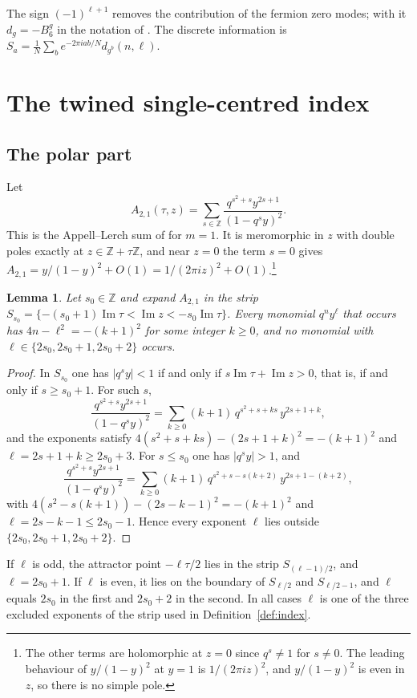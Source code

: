 \documentclass[11pt]{amsart}
\newtheorem{lemma}[theorem]{Lemma}
\theoremstyle{definition}
\newcommand{\ZZ}{\mathbb{Z}}
\begin{document}
The sign $(-1)^{\ell+1}$ removes the contribution of the fermion zero modes; with it $d_g=-B_6^{g}$ in the notation of \cite{GSSV23}. The discrete information is $S_a=\frac1N\sum_be^{-2\pi iab/N}d_{g^b}(n,\ell)$.

\section{The twined single-centred index}\label{sec:finite}

\subsection{The polar part}
Let
\[
A_{2,1}(\tau,z)=\sum_{s\in\ZZ}\frac{q^{s^2+s}y^{2s+1}}{(1-q^sy)^2}.
\]
This is the Appell--Lerch sum of \cite[Section~3]{BM13} for $m=1$. It is meromorphic in $z$ with double poles exactly at $z\in\ZZ+\tau\ZZ$, and near $z=0$ the term $s=0$ gives $A_{2,1}=y/(1-y)^2+O(1)=1/(2\pi iz)^2+O(1)$.\footnote{The other terms are holomorphic at $z=0$ since $q^s\ne1$ for $s\ne0$. The leading behaviour of $y/(1-y)^2$ at $y=1$ is $1/(2\pi iz)^2$, and $y/(1-y)^2$ is even in $z$, so there is no simple pole.}

\begin{lemma}\label{lem:strip}
Let $s_0\in\ZZ$ and expand $A_{2,1}$ in the strip $S_{s_0}=\{-(s_0+1)\operatorname{Im}\tau<\operatorname{Im}z<-s_0\operatorname{Im}\tau\}$. Every monomial $q^ny^\ell$ that occurs has $4n-\ell^2=-(k+1)^2$ for some integer $k\ge0$, and no monomial with $\ell\in\{2s_0,2s_0+1,2s_0+2\}$ occurs.
\end{lemma}

\begin{proof}
In $S_{s_0}$ one has $|q^sy|<1$ if and only if $s\operatorname{Im}\tau+\operatorname{Im}z>0$, that is, if and only if $s\ge s_0+1$. For such $s$,
\[
\frac{q^{s^2+s}y^{2s+1}}{(1-q^sy)^2}=\sum_{k\ge0}(k+1)\,q^{s^2+s+ks}\,y^{2s+1+k},
\]
and the exponents satisfy $4(s^2+s+ks)-(2s+1+k)^2=-(k+1)^2$ and $\ell=2s+1+k\ge2s_0+3$. For $s\le s_0$ one has $|q^sy|>1$, and
\[
\frac{q^{s^2+s}y^{2s+1}}{(1-q^sy)^2}=\sum_{k\ge0}(k+1)\,q^{s^2+s-s(k+2)}\,y^{2s+1-(k+2)},
\]
with $4(s^2-s(k+1))-(2s-k-1)^2=-(k+1)^2$ and $\ell=2s-k-1\le2s_0-1$. Hence every exponent $\ell$ lies outside $\{2s_0,2s_0+1,2s_0+2\}$.
\end{proof}

If $\ell$ is odd, the attractor point $-\ell\tau/2$ lies in the strip $S_{(\ell-1)/2}$, and $\ell=2s_0+1$. If $\ell$ is even, it lies on the boundary of $S_{\ell/2}$ and $S_{\ell/2-1}$, and $\ell$ equals $2s_0$ in the first and $2s_0+2$ in the second. In all cases $\ell$ is one of the three excluded exponents of the strip used in Definition~\ref{def:index}.
\end{document}
